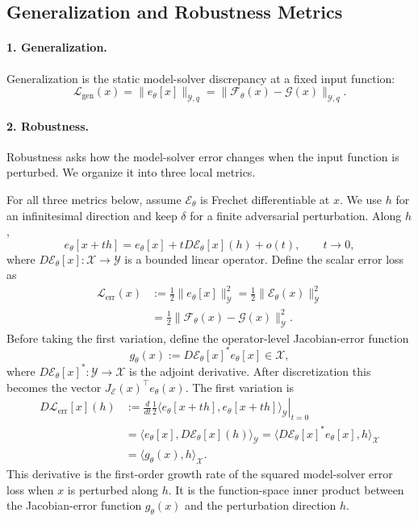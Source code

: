 \documentclass[letterpaper]{article} %
\begin{document}
\subsection{Generalization and Robustness Metrics}

\paragraph{1. Generalization.}
Generalization is the static model-solver discrepancy at a fixed input
function:
\begin{equation}
  \mathcal{L}_{\mathrm{gen}}(x)
  =
  \|e_\theta[x]\|_{\mathcal{Y},q}
  =
  \|\mathcal{F}_\theta(x)-\mathcal{G}(x)\|_{\mathcal{Y},q}.
\end{equation}

\paragraph{2. Robustness.}
Robustness asks how the model-solver error changes when the input function is
perturbed. We organize it into three local metrics.

For all three metrics below, assume $\mathcal{E}_\theta$ is Frechet
differentiable at $x$. We use $h$ for an infinitesimal direction and keep
$\delta$ for a finite adversarial perturbation. Along $h$,
\begin{equation}
  e_\theta[x+t h]
  =
  e_\theta[x]+tD\mathcal{E}_\theta[x](h)+o(t),
  \qquad t\to 0,
\end{equation}
where $D\mathcal{E}_\theta[x]:\mathcal{X}\to\mathcal{Y}$ is a bounded linear
operator. Define the scalar error loss as
\begin{align}
  \mathcal{L}_{\mathrm{err}}(x)
  &:=
  \frac{1}{2}\|e_\theta[x]\|_{\mathcal{Y}}^2
  =
  \frac{1}{2}\|\mathcal{E}_\theta(x)\|_{\mathcal{Y}}^2
  \nonumber\\
  &=
  \frac{1}{2}\|\mathcal{F}_\theta(x)-\mathcal{G}(x)\|_{\mathcal{Y}}^2 .
\end{align}
Before taking the first variation, define the operator-level Jacobian-error
function
\begin{equation}
  g_\theta(x):=D\mathcal{E}_\theta[x]^*e_\theta[x]\in\mathcal{X},
\end{equation}
where $D\mathcal{E}_\theta[x]^*:\mathcal{Y}\to\mathcal{X}$ is the adjoint
derivative. After discretization this becomes the vector
$J_{\mathcal{E}}(x)^\top e_\theta(x)$. The first variation is
\begin{align}
  D\mathcal{L}_{\mathrm{err}}[x](h)
  &:=
  \left.\frac{d}{dt}
  \frac{1}{2}
  \langle e_\theta[x+t h],e_\theta[x+t h]\rangle_{\mathcal{Y}}
  \right|_{t=0}
  \nonumber\\
  &=
  \langle e_\theta[x],D\mathcal{E}_\theta[x](h)\rangle_{\mathcal{Y}}
  =
  \langle D\mathcal{E}_\theta[x]^*e_\theta[x],h\rangle_{\mathcal{X}}
  \nonumber\\
  &=
  \langle g_\theta(x),h\rangle_{\mathcal{X}}.
\end{align}
This derivative is the first-order growth rate of the squared model-solver error
loss when $x$ is perturbed along $h$. It is the function-space inner product
between the Jacobian-error function $g_\theta(x)$ and the perturbation direction
$h$.
\end{document}
